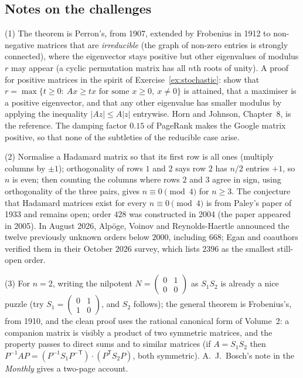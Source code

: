 \subsection*{Notes on the challenges}

(1) The theorem is Perron's, from 1907, extended by Frobenius in 1912 to non-negative matrices that are \emph{irreducible} (the graph of non-zero entries is strongly connected), where the eigenvector stays positive but other eigenvalues of modulus $r$ may appear (a cyclic permutation matrix has all $n$th roots of unity). A proof for positive matrices in the spirit of Exercise~\ref{ex:stochastic}: show that $r=\max\{t\ge0:\ Ax\ge tx\text{ for some }x\ge0,\ x\ne0\}$ is attained, that a maximiser is a positive eigenvector, and that any other eigenvalue has smaller modulus by applying the inequality $|Az|\le A|z|$ entrywise. Horn and Johnson, Chapter~8, is the reference. The damping factor $0.15$ of PageRank makes the Google matrix positive, so that none of the subtleties of the reducible case arise.

(2) Normalise a Hadamard matrix so that its first row is all ones (multiply columns by $\pm1$); orthogonality of rows $1$ and $2$ says row $2$ has $n/2$ entries $+1$, so $n$ is even; then counting the columns where rows $2$ and $3$ agree in sign, using orthogonality of the three pairs, gives $n\equiv0\pmod4$ for $n\ge3$. The conjecture that Hadamard matrices exist for every $n\equiv0\pmod4$ is from Paley's paper of 1933 and remains open; order $428$ was constructed in 2004 (the paper appeared in 2005). In August 2026, Alp\"oge, Voinov and Reynolds-Haertle announced the twelve previously unknown orders below $2000$, including $668$; Egan and coauthors verified them in their October 2026 survey, which lists $2396$ as the smallest still-open order.

(3) For $n=2$, writing the nilpotent $N=\begin{pmatrix}0&1\\0&0\end{pmatrix}$ as $S_1S_2$ is already a nice puzzle (try $S_1=\begin{pmatrix}0&1\\1&0\end{pmatrix}$, and $S_2$ follows); the general theorem is Frobenius's, from 1910, and the clean proof uses the rational canonical form of Volume~2: a companion matrix is visibly a product of two symmetric matrices, and the property passes to direct sums and to similar matrices (if $A=S_1S_2$ then $P^{-1}AP=(P^{-1}S_1P^{-\mathsf T})\cdot(P^{\mathsf T}S_2P)$, both symmetric). A.~J.~Bosch's note in the \emph{Monthly} gives a two-page account.

